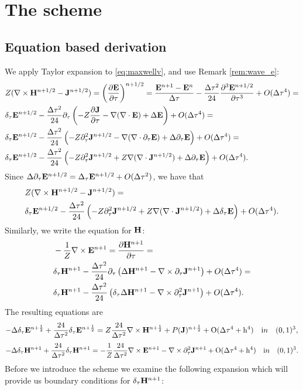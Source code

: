 \documentclass[12pt,reqno]{amsart}
\newcommand{\e}{{\bf E}}
\newcommand{\h}{{\bf H}}
\newcommand{\J}{{\bf J}}
\theoremstyle{definition}
\numberwithin{equation}{section}
\begin{document}
   
	\section{The scheme}
	\subsection{Equation based derivation}
	We apply Taylor expansion to \eqref{eq:maxwellv}, and use Remark \ref{rem:wave_e}:
	\begin{align*}
	&
	Z(\nabla \times \h^{n+1/2}-\J^{n+1/2})=	\left (  \frac{\partial \e}{\partial \tau} \right)^{n+1/2}=
		\frac{\e^{n+1} -\e^n}{\Delta \tau}-\frac{\Delta \tau^2}{24}\frac{\partial^3 \e^{n+1/2}}{\partial \tau^3}+O(\Delta \tau^4)=\\&
		\delta_{\tau}\e^{n+1/2}-\frac{\Delta \tau^2}{24}\partial_{\tau}
		\left(
		-Z\frac{\partial \J}{\partial \tau}-\nabla(\nabla \cdot \e)+\Delta \e
		\right)+O(\Delta \tau^4)=\\&
			\delta_{\tau}\e^{n+1/2}-\frac{\Delta \tau^2}{24}
		\left(
		-Z\partial_{\tau}^2\J^{n+1/2}
		-\nabla(\nabla\cdot\partial_\tau \e)+\Delta \partial_{\tau}\e
		\right)+O(\Delta \tau^4)=\\&
			\delta_{\tau}\e^{n+1/2}-\frac{\Delta \tau^2}{24}
		\left(
		-Z\partial_{\tau}^2\J^{n+1/2}
		+Z\nabla(\nabla\cdot\J^{n+1/2})+\Delta \partial_{\tau}\e
		\right)+O(\Delta \tau^4).
	\end{align*}
Since  $\Delta \partial_{\tau}\e^{n+1/2}=\Delta_{\tau} \e^{n+1/2}+O(\Delta \tau^2) $,
we have 
that 
\begin{align*}
	&
		Z(\nabla \times \h^{n+1/2}-\J^{n+1/2})=\\&
	\delta_{\tau}\e^{n+1/2}-\frac{\Delta \tau^2}{24}
\left(
-Z\partial_{\tau}^2\J^{n+1/2}
+Z\nabla(\nabla\cdot\J^{n+1/2})+\Delta \delta_{\tau}\e
\right)+O(\Delta \tau^4).
\end{align*}
Similarly, we write the equation for $\h$:
\begin{align*}
	& 
	-\frac{1}{Z}\nabla \times \e^{n+1}=\frac{\partial \h^{n+1}}{\partial \tau}=\\&
	\delta_\tau \h^{n+1}-\frac{\Delta \tau^2}{24}\partial_{\tau}\left ( 
\Delta \h^{n+1}-\nabla \times \partial_{\tau}\J^{n+1}
	\right)+O(\Delta \tau^4)=\\&
		\delta_\tau \h^{n+1}-\frac{\Delta \tau^2}{24}\left ( 
	\delta_{\tau}\Delta\h^{n+1}-\nabla \times \partial_{\tau}^2\J^{n+1}
	\right)+O(\Delta \tau^4).
\end{align*}
The resulting equations are
	$$
	-\Delta\delta_{\tau} \e^{n+\frac{1}{2}}+\frac{24}{\Delta \tau^2}\delta_{\tau}\e^{n+\frac{1}{2}}=
	Z\frac{24}{\Delta \tau^2}\nabla\times \h^{n+\frac{1}{2}}+P(\J)^{n+\frac{1}{2}}+
	\mathrm{O(\Delta \tau^4+h^4)} \quad {\mathrm in} \quad (0,1)^3,
	$$
		$$
	-\Delta \delta_{\tau}\h^{n+1}+\frac{24}{\Delta \tau^2}\delta_{\tau}\h^{n+1}=
	-\frac{1}{Z}\frac{24}{\Delta \tau^2}\nabla\times \e^{n+1}
	-\nabla\times\partial_{\tau}^2\J^{n+1}+
	\mathrm{O(\Delta \tau^4+h^4)} 
	\quad {\mathrm in} \quad (0,1)^3.
	$$
   Before we introduce the scheme we examine the following expansion which will provide us boundary conditions for $\delta_\tau \h^{n+1}$:
\end{document}
